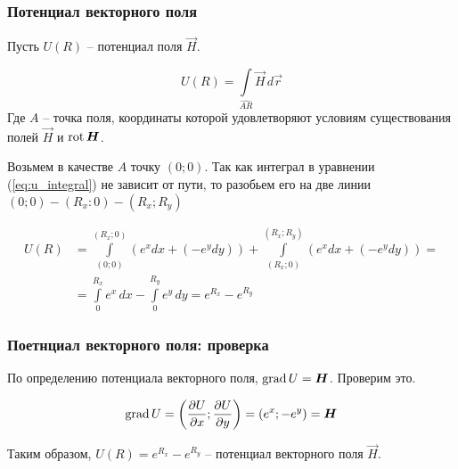 \begin{frame}\frametitle{Потенциал векторного поля}
  Пусть \(U(R)\) -- потенциал поля \(\vec H\).
  
  \begin{equation}
      U(R) =
      \int\limits_{\widehat{AR}} \vec H \, d \vec r
    \label{eq:u_integral}
  \end{equation}
  Где $A$ -- точка поля, координаты которой удовлетворяют условиям
  существования полей $\vec H$ и $\rot \vec H$.

  Возьмем в качестве $A$ точку $(0; 0)$.
  Так как интеграл в уравнении (\ref{eq:u_integral}) не зависит от пути,
  то разобьем его на две линии $(0; 0) - (R_x: 0) - (R_x; R_y)$

  \begin{align}
    U(R) &= \int\limits_{(0; 0)}^{(R_x; 0)} \left(e^x dx + (-e^y dy) \right) +
    \int\limits_{(R_x; 0)}^{(R_x; R_y)} \left(e^x dx + (-e^y dy) \right) = \\
         &=
    \int\limits_{0}^{R_x} e^x \, dx - \int\limits_{0}^{R_y} e^y \, dy =
    e^{R_x} - e^{R_y}
    \label{eq:}
  \end{align}
	
\end{frame}

\begin{frame}\frametitle{Поетнциал векторного поля: проверка}
  По определению потенциала векторного поля, $\grad U = \vec H$. Проверим это.

  \begin{equation}
    \grad U =
    \left( \frac{\partial U}{\partial x}; \frac{\partial U}{\partial y} \right) =
    \left( e^x; -e^y \right)
    = \vec H
  \end{equation}

  Таким образом, \(U(R) = e^{R_x} - e^{R_y}\) -- потенциал векторного поля \(\vec H\).
\end{frame}
